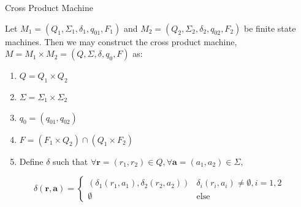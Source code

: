 \documentclass[sigplan,anonymous,review]{acmart}
\begin{document}
\begin{algorithm}
\caption{Cross Product Machine}

\begin{algorithmic}[1]
    \STATE {$\Sigma \gets \emptyset$}
     
    \REPEAT
            
                \STATE{$\Sigma \gets \Sigma \cup \mathbf{\sigma}$}
                
                \ENDIF
            \ENDFOR
        \ENDFOR
\end{algorithmic}
\end{algorithm}

Let $M_1 = (Q_1, \Sigma_1, \delta_1, q_{01}, F_1)$ and $M_2 = (Q_2, \Sigma_2, \delta_2, q_{02}, F_2)$ be finite state machines. Then we may construct the cross product machine, $M = M_1 \times M_2 = (Q, \Sigma, \delta, q_0, F)$ as: 

\begin{enumerate}
    \item $Q = Q_1 \times Q_2$
    \item $\Sigma = \Sigma_1 \times \Sigma_2$
    \item $q_0 = (q_{01}, q_{02})$
    \item $F = (F_1 \times Q_2) \cap (Q_1 \times F_2)$
    \item Define $\delta$ such that $\forall \mathbf{r} = (r_1, r_2) \in Q, \forall \mathbf{a} = (a_1, a_2) \in \Sigma,$ 
\end{enumerate}
\[\delta(\mathbf r, \mathbf a) = \begin{cases}
    (\delta_1(r_1, a_1), \delta_2(r_2, a_2)) & \delta_i(r_i, a_i) \neq \emptyset, i = 1, 2\\
    \emptyset & \mathrm{else}
\end{cases}\]
\end{document}
